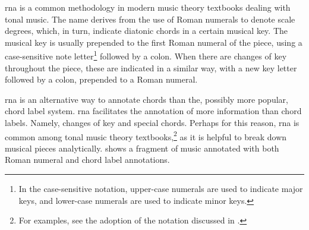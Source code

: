 

\gls{rna} is a common methodology in modern music theory
textbooks dealing with tonal music. The name derives from
the use of Roman numerals to denote scale degrees, which, in
turn, indicate diatonic chords in a certain musical key. The
musical key is usually prepended to the first Roman numeral
of the piece, using a case-sensitive note letter\footnote{In
the case-sensitive notation, upper-case numerals are used to
indicate major keys, and lower-case numerals are used to
indicate minor keys.} followed by a colon. When there are
changes of key throughout the piece, these are indicated in
a similar way, with a new key letter followed by a colon,
prepended to a Roman numeral.

\gls{rna} is an alternative way to annotate chords than the,
possibly more popular, chord label system. \gls{rna}
facilitates the annotation of more information than chord
labels. Namely, changes of key and special chords. Perhaps
for this reason, \gls{rna} is common among tonal music
theory textbooks,\footnote{For examples, see the adoption of
the notation discussed in
.} as it is
helpful to break down musical pieces analytically.
 shows a fragment of music annotated with
both Roman numeral and chord label annotations.

